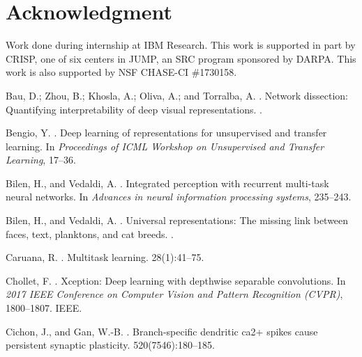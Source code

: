 \documentclass[letterpaper]{article} \usepackage{aaai19}  \usepackage{times}  \usepackage{helvet}  \usepackage{courier}  \usepackage{url}  \usepackage{graphicx}  \usepackage{amssymb}
\begin{document}
\section{Acknowledgment}
Work done during internship at IBM Research. This work is supported in part by CRISP, one of six centers in JUMP, an SRC program sponsored by DARPA. This work is also supported by NSF CHASE-CI \#1730158.



\begin{thebibliography}{}

Bau, D.; Zhou, B.; Khosla, A.; Oliva, A.; and Torralba, A.
.
\newblock Network dissection: Quantifying interpretability of deep visual
  representations.
.

Bengio, Y.
.
\newblock Deep learning of representations for unsupervised and transfer
  learning.
\newblock In {\em Proceedings of ICML Workshop on Unsupervised and Transfer
  Learning},  17--36.

Bilen, H., and Vedaldi, A.
.
\newblock Integrated perception with recurrent multi-task neural networks.
\newblock In {\em Advances in neural information processing systems},
  235--243.

Bilen, H., and Vedaldi, A.
.
\newblock Universal representations: The missing link between faces, text,
  planktons, and cat breeds.
.

Caruana, R.
.
\newblock Multitask learning.
 28(1):41--75.

Chollet, F.
.
\newblock Xception: Deep learning with depthwise separable convolutions.
\newblock In {\em 2017 IEEE Conference on Computer Vision and Pattern
  Recognition (CVPR)},  1800--1807.
\newblock IEEE.

Cichon, J., and Gan, W.-B.
.
\newblock Branch-specific dendritic ca2+ spikes cause persistent synaptic
  plasticity.
 520(7546):180--185.


\end{thebibliography}
\end{document}
